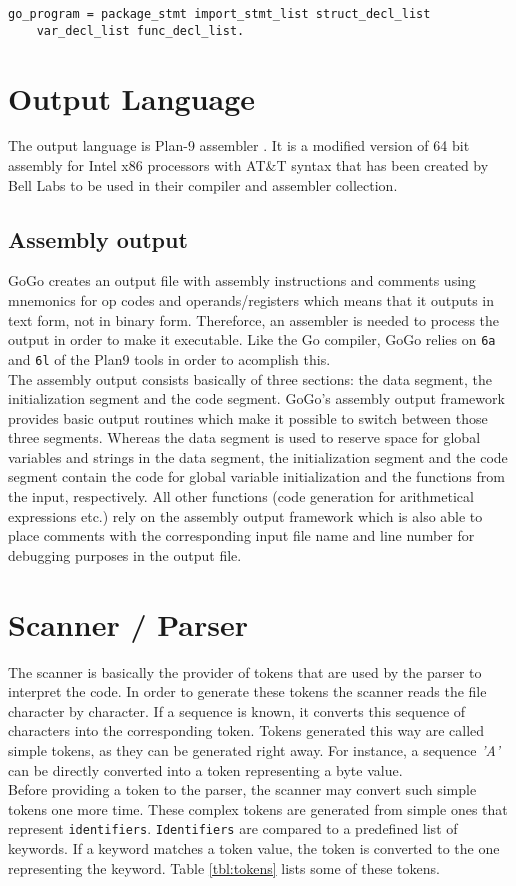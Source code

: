 \documentclass[a4paper]{scrreprt}
\begin{document}
        \begin{lstlisting}[caption=GoGo Program]
go_program = package_stmt import_stmt_list struct_decl_list 
    var_decl_list func_decl_list.
        \end{lstlisting}


  \chapter{Output Language}
    The output language is Plan-9 assembler \cite{pik00}. It is a modified version of 64 bit assembly for Intel x86 processors with AT\&T syntax that has been created by Bell Labs to be used in their compiler and assembler collection.
    
    \section{Assembly output}
      GoGo creates an output file with assembly instructions and comments using mnemonics for op codes and operands/registers which means that it outputs in text form, not in binary form. Thereforce, an assembler is needed to process the output in order to make it executable. Like the Go compiler, GoGo relies on \texttt{6a} and \texttt{6l} of the Plan9 tools in order to acomplish this\cite{pik00}.\\
      The assembly output consists basically of three sections: the data segment, the initialization segment and the code segment. GoGo's assembly output framework provides basic output routines which make it possible to switch between those three segments. Whereas the data segment is used to reserve space for global variables and strings in the data segment, the initialization segment and the code segment contain the code for global variable initialization and the functions from the input, respectively. All other functions (code generation for arithmetical expressions etc.) rely on the assembly output framework which is also able to place comments with the corresponding input file name and line number for debugging purposes in the output file.

  \chapter{Scanner / Parser}
    The scanner is basically the provider of tokens that are used by the parser
    to interpret the code. In order to generate these tokens the scanner reads
    the file character by character. If a sequence is known, it converts this 
    sequence of characters into the corresponding token. Tokens generated this
    way are called simple tokens, as they can be generated right away. For 
    instance, a sequence \textit{'A'} can be directly converted into a token 
    representing a byte value. \\
    Before providing a token to the parser, the scanner may convert such 
    simple tokens one more time. These complex tokens are generated from simple
    ones that represent \texttt{identifiers}. \texttt{Identifiers} are compared to a 
    predefined list of keywords. If a keyword matches a token value, the token
    is converted to the one representing the keyword. Table \ref{tbl:tokens} 
    lists some of these tokens.
\end{document}
